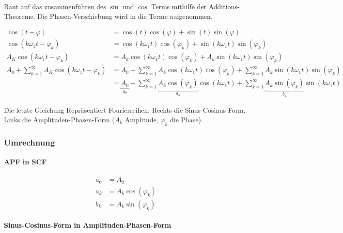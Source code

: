 Baut auf das zusammenführen des $\sin$ und $\cos$ Terms mithilfe der Additions-Theoreme. Die Phasen-Verschiebung wird in die Terme aufgenommen.

\begin{align}
	\cos(t - \varphi) &= \cos(t) \cos(\varphi) + \sin( t) \sin(\varphi) \\
	\cos(k \omega_1 t - \varphi_k) &= \cos(k \omega_1 t) \cos(\varphi_k) + \sin(k \omega_1 t) \sin(\varphi_k) \\
	A_K \cos(k \omega_1 t - \varphi_k) &= A_k \cos(k \omega_1 t) \cos(\varphi_k) + A_k \sin(k \omega_1 t) \sin(\varphi_k) \\
	A_0 + \sum^\infty_{k=1} A_K \cos(k \omega_1 t - \varphi_k) &= A_0 + \sum^\infty_{k=1} A_k \cos(k \omega_1 t) \cos(\varphi_k) + \sum^\infty_{k=1} A_k \sin(k \omega_1 t) \sin(\varphi_k) \\
	&= \underbracket{A_0}_{a_0} + \sum^\infty_{k=1} \underbracket{A_k \cos(\varphi_k)}_{a_k} \cos(k \omega_1 t) + \sum^\infty_{k=1} \underbracket{A_k \sin(\varphi_k)}_{b_k} \sin(k \omega_1 t)
\end{align}

Die letzte Gleichung Repräsentiert Fourierreihen; Rechts die Sinus-Cosinus-Form, Links die Amplituden-Phasen-Form ($A_k$ Amplitude, $\varphi_k$ die Phase).

\subsubsection{Umrechnung}

\paragraph{APF in SCF}
\begin{align*}
a_0 &= A_0 \\
a_k &= A_k \cos(\varphi_k) \\
b_k &= A_k \sin(\varphi_k)
\end{align*}

\paragraph{Sinus-Cosinus-Form in Amplituden-Phasen-Form}

